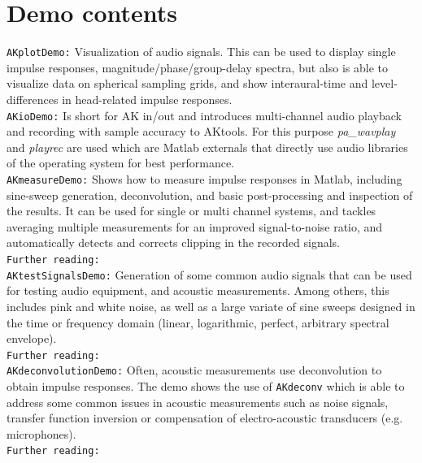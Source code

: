 \documentclass[11pt]{scrartcl}
\begin{document}
\clearpage

\section*{{\color{tu_red}Demo contents}}

\noindent
{\color{tu_red}\texttt{AKplotDemo:}} Visualization of audio signals. This can be used to display single impulse responses, magnitude/phase/group-delay spectra, but also is able to visualize data on spherical sampling grids, and show interaural-time and level-differences in head-related impulse responses.\\

\noindent
{\color{tu_red}\texttt{AKioDemo:}} Is short for AK in/out and introduces multi-channel audio playback and recording with sample accuracy to AKtools. For this purpose \emph{pa\_wavplay} and \emph{playrec} are used which are Matlab externals that directly use audio libraries of the operating system for best performance.\\

\noindent
{\color{tu_red}\texttt{AKmeasureDemo:}} Shows how to measure impulse responses in Matlab, including sine-sweep generation, deconvolution, and basic post-processing and inspection of the results. It can be used for single or multi channel systems, and tackles averaging multiple measurements for an improved signal-to-noise ratio, and automatically detects and corrects clipping in the recorded signals.\\
\texttt{Further reading:} \citet{Muller2001}\\

\noindent
{\color{tu_red}\texttt{AKtestSignalsDemo:}} Generation of some common audio signals that can be used for testing audio equipment, and acoustic measurements. Among others, this includes pink and white noise, as well as a large variate of sine sweeps designed in the time or frequency domain (linear, logarithmic, perfect, arbitrary spectral envelope).\\
\texttt{Further reading:} \citet{Muller2001, Antweiler2011, Novak2010}\\

\noindent
{\color{tu_red}\texttt{AKdeconvolutionDemo:}} Often, acoustic measurements use deconvolution to obtain impulse responses. The demo shows the use of \texttt{AKdeconv} which is able to address some common issues in acoustic measurements such as noise signals, transfer function inversion or compensation of electro-acoustic transducers (e.g. microphones).\\
\texttt{Further reading:} \citet{Muller2001}\\
\end{document}
